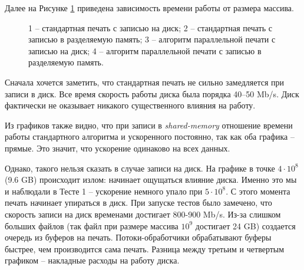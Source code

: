Далее на Рисунке \ref{grap} приведена зависимость времени работы от размера массива.
\begin{figure}[h!]
\caption{
1 -- стандартная печать с записью на диск;
2 -- стандартная печать с записью в разделяемую память;
3 -- алгоритм параллельной печати с записью на диск;
4 -- алгоритм параллельной печати с записью в разделяемую память.} \label{grap}
\end{figure}

Сначала хочется заметить, что стандартная печать не сильно замедляется при записи в диск. 
Все время скорость работы диска была порядка 40--50 Mb/s.
Диск фактически не оказывает никакого существенного влияния на работу.

Из графиков также видно, что при записи в \textit{shared-memory} отношение времени работы стандартного алгоритма и ускоренного постоянно, так как оба графика -- прямые.
Это значит, что ускорение одинаково на всех данных.

Однако, такого нельзя сказать в случае записи на диск.
На графике в точке $4 \cdot 10^8$ (9.6 GB) происходит излом: начинает ощущаться влияние диска. Именно это мы и наблюдали в Тесте 1 -- ускорение немного упало при $5 \cdot 10^8$.
С этого момента печать начинает упираться в диск.
При запуске тестов было замечено, что скорость записи на диск временами достигает 800-900 Mb/s.
Из-за слишком больших файлов (так файл при размере массива $10^9$ достигает 24 GB) создается очередь из буферов на печать.
Потоки-обработчики обрабатывают буферы быстрее, чем производится сама печать.
Разница между третьим и четвертым графиком -- накладные расходы на работу диска.

